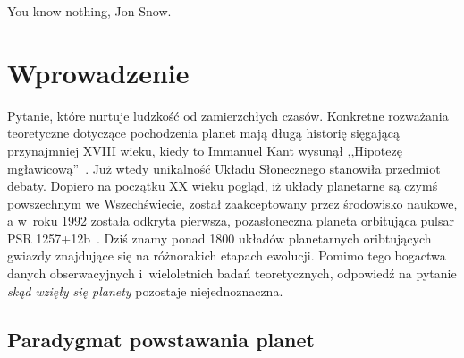 \begin{savequote}[75mm]
   You know nothing, Jon Snow.
\end{savequote}

\chapter{Wprowadzenie}
 Pytanie, które nurtuje ludzkość od
zamierzchłych czasów. Konkretne rozważania teoretyczne dotyczące pochodzenia
planet mają długą historię sięgającą przynajmniej XVIII wieku, kiedy to Immanuel
Kant wysunął ,,Hipotezę mgławicową''~\cite{ImmanuelKant.etal:2008}. Już wtedy
unikalność Układu Słonecznego stanowiła przedmiot debaty. Dopiero na początku XX
wieku pogląd, iż układy planetarne są czymś powszechnym we Wszechświecie, został
zaakceptowany przez środowisko naukowe, a w~roku 1992 została odkryta pierwsza,
pozasłoneczna planeta orbitująca pulsar PSR 1257+12b~\cite{1992Natur.355..145W}.
Dziś znamy ponad 1800 układów planetarnych oribtujących gwiazdy znajdujące się
na różnorakich etapach ewolucji. Pomimo tego bogactwa danych obserwacyjnych
i~wieloletnich badań teoretycznych, odpowiedź na pytanie \emph{skąd wzięły się
planety} pozostaje niejednoznaczna.


\section{Paradygmat powstawania planet}
